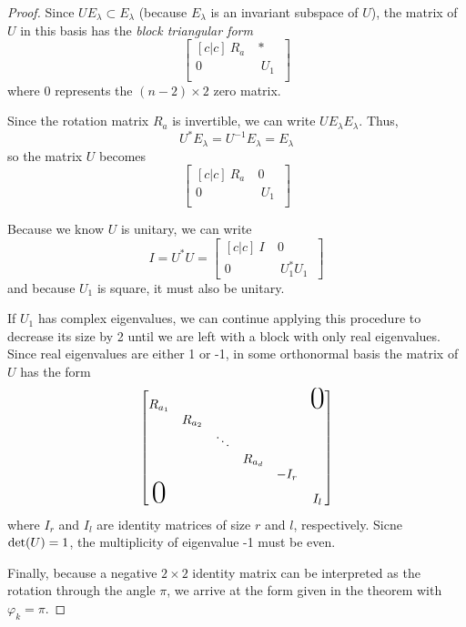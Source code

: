 \begin{proof}
Since $U E_{\lambda} \subset E_{\lambda}$ (because $E_{\lambda}$ is an invariant subspace of $U$), the matrix of $U$ in this basis has the \textit{block triangular form} 
$$\begin{bmatrix}[c|c]
 \: R_{a} \:  & * \\
\hline 
0 & \:  U_{1} \:  \\
\end{bmatrix}$$
where 0 represents the $(n - 2) \times 2$ zero matrix. 

Since the rotation matrix $R_{a}$ is invertible, we can write $UE_{\lambda} E_{\lambda}$. Thus, 
$$U^{*} E_{\lambda} = U^{-1} E_{\lambda} = E_{\lambda}$$
so the matrix $U$ becomes 
$$\begin{bmatrix}[c|c]
 \: R_{a} \:  & 0 \\
\hline 
0 & \:  U_{1} \:  \\
\end{bmatrix}$$

Because we know $U$ is unitary, we can write 
$$I = U^{*}U = \begin{bmatrix}[c|c]
\: I \: & 0 \\
\hline
0 & \: U_{1}^{*} U_{1} \:
\end{bmatrix}$$
and because $U_{1}$ is square, it must also be unitary. 

If $U_{1}$ has complex eigenvalues, we can continue applying this procedure to decrease its size by 2 until we are left with a block with only real eigenvalues. Since real eigenvalues are either 1 or -1, in some orthonormal basis the matrix of $U$ has the form 
$$\begin{bmatrix}
R_{a_{1}} & & & & & \makebox{\Huge 0} \\
 & R_{a_{2}} & & & \\ 
 & & \ddots & & \\
 & & & R_{a_{d}} & \\
 & & & & -I_{r} & \\
 \makebox{\Huge 0} & & & & & I_{l}
\end{bmatrix}$$
where $I_{r}$ and $I_{l}$ are identity matrices of size $r$ and $l$, respectively. Sicne $\operatorname{det}(U) = 1$, the multiplicity of eigenvalue -1 must be even. 

Finally, because a negative $2 \times 2$ identity matrix can be interpreted as the rotation through the angle $\pi$, we arrive at the form given in the theorem with $\varphi_{k} = \pi$. 
\end{proof}
